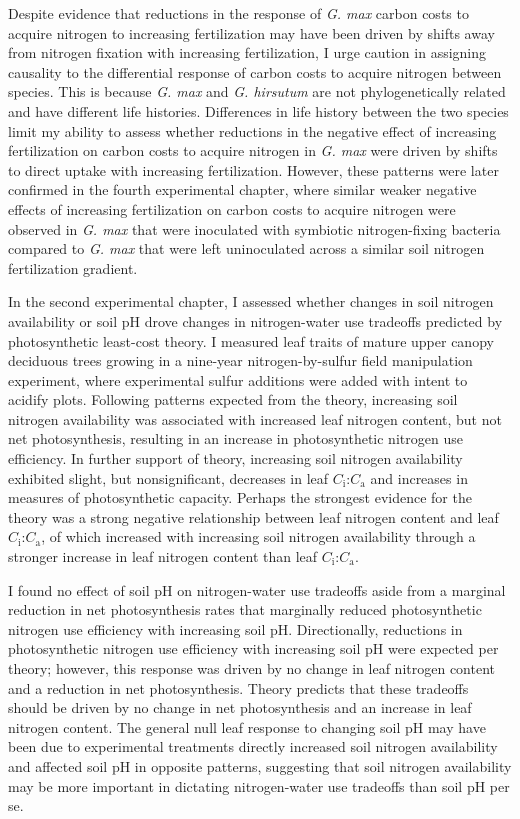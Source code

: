 Despite evidence that reductions in the response of \textit{G. max} carbon costs to acquire nitrogen to increasing fertilization may have been driven by shifts away from nitrogen fixation with increasing fertilization, I urge caution in assigning causality to the differential response of carbon costs to acquire nitrogen between species. This is because \textit{G. max} and \textit{G. hirsutum} are not phylogenetically related and have different life histories. Differences in life history between the two species limit my ability to assess whether reductions in the negative effect of increasing fertilization on carbon costs to acquire nitrogen in \textit{G. max} were driven by shifts to direct uptake with increasing fertilization. However, these patterns were later confirmed in the fourth experimental chapter, where similar weaker negative effects of increasing fertilization on carbon costs to acquire nitrogen were observed in \textit{G. max} that were inoculated with symbiotic nitrogen-fixing bacteria compared to \textit{G. max} that were left uninoculated across a similar soil nitrogen fertilization gradient.

In the second experimental chapter, I assessed whether changes in soil nitrogen availability or soil pH drove changes in nitrogen-water use tradeoffs predicted by photosynthetic least-cost theory. I measured leaf traits of mature upper canopy deciduous trees growing in a nine-year nitrogen-by-sulfur field manipulation experiment, where experimental sulfur additions were added with intent to acidify plots. Following patterns expected from the theory, increasing soil nitrogen availability was associated with increased leaf nitrogen content, but not net photosynthesis, resulting in an increase in photosynthetic nitrogen use efficiency. In further support of theory, increasing soil nitrogen availability exhibited slight, but nonsignificant, decreases in leaf $C_\mathrm{i}$:$C_\mathrm{a}$ and increases in measures of photosynthetic capacity. Perhaps the strongest evidence for the theory was a strong negative relationship between leaf nitrogen content and leaf $C_\mathrm{i}$:$C_\mathrm{a}$, of which increased with increasing soil nitrogen availability through a stronger increase in leaf nitrogen content than leaf $C_\mathrm{i}$:$C_\mathrm{a}$.

I found no effect of soil pH on nitrogen-water use tradeoffs aside from a marginal reduction in net photosynthesis rates that marginally reduced photosynthetic nitrogen use efficiency with increasing soil pH. Directionally, reductions in photosynthetic nitrogen use efficiency with increasing soil pH were expected per theory; however, this response was driven by no change in leaf nitrogen content and a reduction in net photosynthesis. Theory predicts that these tradeoffs should be driven by no change in net photosynthesis and an increase in leaf nitrogen content. The general null leaf response to changing soil pH may have been due to experimental treatments directly increased soil nitrogen availability and affected soil pH in opposite patterns, suggesting that soil nitrogen availability may be more important in dictating nitrogen-water use tradeoffs than soil pH per se.

